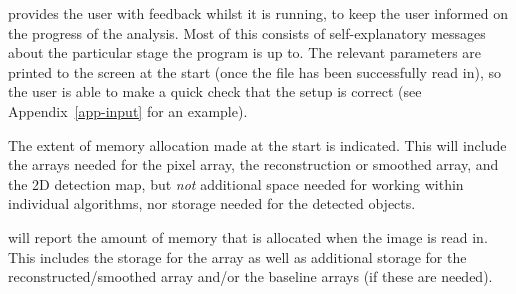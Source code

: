 %
%
%
%
\label{sec-output}

 
\duchamp provides the user with feedback whilst it is running, to
keep the user informed on the progress of the analysis. Most of this
consists of self-explanatory messages about the particular stage the
program is up to. The relevant parameters are printed to the screen at
the start (once the file has been successfully read in), so the user
is able to make a quick check that the setup is correct (see
Appendix~\ref{app-input} for an example).

The extent of memory allocation made at the start is indicated. This
will include the arrays needed for the pixel array, the reconstruction
or smoothed array, and the 2D detection map, but \emph{not} additional
space needed for working within individual algorithms, nor storage
needed for the detected objects.

\duchamp will report the amount of memory that is allocated when the
image is read in. This includes the storage for the array as well as
additional storage for the reconstructed/smoothed array and/or the
baseline arrays (if these are needed).

